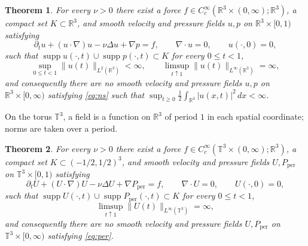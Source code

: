 \documentclass{article}
\newtheorem{theorem}{Theorem}
\DeclareMathOperator{\supp}{supp}
\newcommand{\T}{\mathbb{T}}
\newcommand{\R}{\mathbb{R}}
\begin{document}
\begin{theorem}\label{blowup}
For every $\nu>0$ there exist a force
$f\in C_c^\infty(\mathbb R^3\times(0,\infty);\mathbb R^3)$, a compact set
$K\subset\mathbb R^3$, and smooth velocity and pressure fields
$u,p$ on $\mathbb R^3\times[0,1)$ satisfying
\begin{equation}
  \partial_tu+(u\cdot\nabla)u-\nu\Delta u+\nabla p=f,
  \qquad \nabla\cdot u=0,
  \qquad u(\cdot,0)=0,
  \label{eq:ns}
\end{equation}
such that $\supp u(\cdot,t)\cup\supp p(\cdot,t)\subset K$ for every
$0\leq t<1$,
\begin{equation*}
  \sup_{0\leq t<1}\lVert u(t)\rVert_{L^2(\mathbb R^3)}<\infty,
  \qquad
  \limsup_{t\uparrow1}\lVert u(t)\rVert_{L^\infty(\mathbb R^3)}=\infty,
\end{equation*}
and consequently there are no smooth velocity and pressure fields $u,p$ on
$\mathbb R^3\times[0,\infty)$ satisfying \eqref{eq:ns} such that
$\sup_{t\geq0}\frac12\int_{\mathbb R^3}|u(x,t)|^2\,dx<\infty$.
\end{theorem}

On the torus $\T^3$, a field is a function on $\R^3$ of period $1$ in each spatial
coordinate; norms are taken over a period.

\begin{theorem}\label{periodic}
For every $\nu>0$ there exist a force $f\in C_c^\infty(\T^3\times(0,\infty);\R^3)$, a
compact set $K\subset(-1/2,1/2)^3$, and smooth velocity and pressure fields
$U,P_{\mathrm{per}}$ on $\T^3\times[0,1)$ satisfying
\begin{equation}
  \partial_tU+(U\cdot\nabla)U-\nu\Delta U+\nabla P_{\mathrm{per}}=f,
  \qquad \nabla\cdot U=0,
  \qquad U(\cdot,0)=0,
  \label{eq:per}
\end{equation}
such that $\supp U(\cdot,t)\cup\supp P_{\mathrm{per}}(\cdot,t)\subset K$ for every
$0\le t<1$,
\[
  \limsup_{t\uparrow1}\|U(t)\|_{L^\infty(\T^3)}=\infty,
\]
and consequently there are no smooth velocity and pressure fields
$U,P_{\mathrm{per}}$ on $\T^3\times[0,\infty)$ satisfying \eqref{eq:per}.
\end{theorem}
\end{document}
